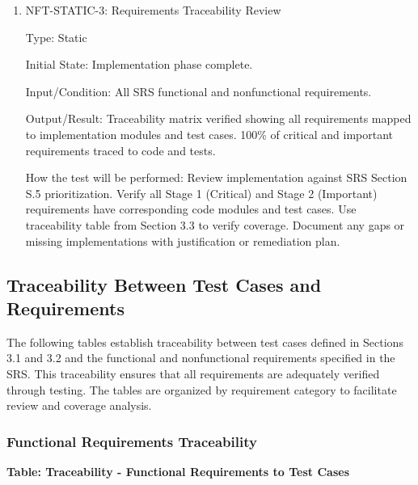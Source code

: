 \documentclass[12pt, titlepage]{article}
\begin{document}
\begin{enumerate}
\item{NFT-STATIC-3: Requirements Traceability Review\\}

Type: Static

Initial State: Implementation phase complete.

Input/Condition: All SRS functional and nonfunctional requirements.

Output/Result: Traceability matrix verified showing all requirements mapped to
implementation modules and test cases. 100\% of critical and important
requirements traced to code and tests.

How the test will be performed: Review implementation against SRS Section S.5
prioritization. Verify all Stage 1 (Critical) and Stage 2 (Important)
requirements have corresponding code modules and test cases. Use traceability
table from Section 3.3 to verify coverage. Document any gaps or missing
implementations with justification or remediation plan.

\end{enumerate}

\subsection{Traceability Between Test Cases and Requirements}

The following tables establish traceability between test cases defined in
Sections 3.1 and 3.2 and the functional and nonfunctional requirements specified
in the SRS. This traceability ensures that all requirements are
adequately verified through testing. The tables are organized by requirement
category to facilitate review and coverage analysis.

\subsubsection{Functional Requirements Traceability}

\noindent
\textbf{Table: Traceability - Functional Requirements to Test Cases}
\end{document}
